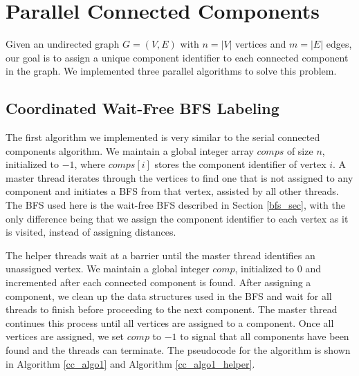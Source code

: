 \section{Parallel Connected Components}
\label{cc_sec}

Given an undirected graph $G = (V, E)$ with $n = |V|$ vertices and $m = |E|$ edges, our goal is to assign a unique component identifier to each connected component in the graph. We implemented three parallel algorithms to solve this problem.

\subsection{Coordinated Wait-Free BFS Labeling}

The first algorithm we implemented is very similar to the serial connected components algorithm. We maintain a global integer array $comps$ of size $n$, initialized to $-1$, where $comps[i]$ stores the component identifier of vertex $i$. A master thread iterates through the vertices to find one that is not assigned to any component and initiates a BFS from that vertex, assisted by all other threads. The BFS used here is the wait-free BFS described in Section \ref{bfs_sec}, with the only difference being that we assign the component identifier to each vertex as it is visited, instead of assigning distances.

The helper threads wait at a barrier until the master thread identifies an unassigned vertex. We maintain a global integer $comp$, initialized to $0$ and incremented after each connected component is found. After assigning a component, we clean up the data structures used in the BFS and wait for all threads to finish before proceeding to the next component. The master thread continues this process until all vertices are assigned to a component. Once all vertices are assigned, we set $comp$ to $-1$ to signal that all components have been found and the threads can terminate. The pseudocode for the algorithm is shown in Algorithm \ref{cc_algo1} and Algorithm \ref{cc_algo1_helper}.

